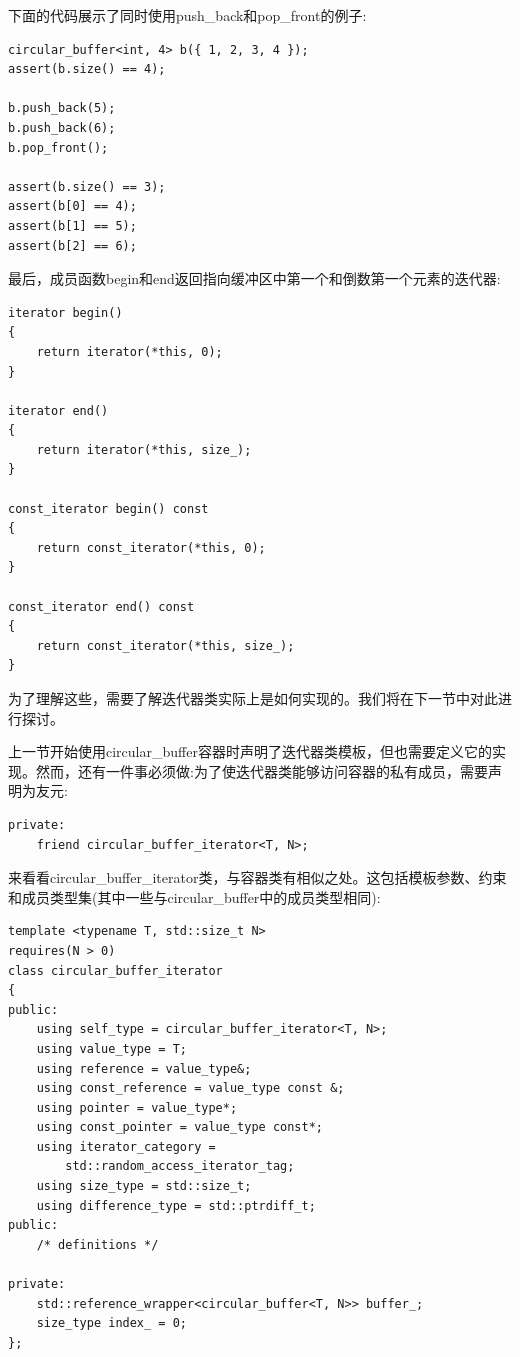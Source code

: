 下面的代码展示了同时使用push\_back和pop\_front的例子:

\begin{lstlisting}[style=styleCXX]
circular_buffer<int, 4> b({ 1, 2, 3, 4 });
assert(b.size() == 4);

b.push_back(5);
b.push_back(6);
b.pop_front();

assert(b.size() == 3);
assert(b[0] == 4);
assert(b[1] == 5);
assert(b[2] == 6);
\end{lstlisting}

最后，成员函数begin和end返回指向缓冲区中第一个和倒数第一个元素的迭代器:

\begin{lstlisting}[style=styleCXX]
iterator begin()
{
	return iterator(*this, 0);
}

iterator end()
{
	return iterator(*this, size_);
}

const_iterator begin() const
{
	return const_iterator(*this, 0);
}

const_iterator end() const
{
	return const_iterator(*this, size_);
}
\end{lstlisting}

为了理解这些，需要了解迭代器类实际上是如何实现的。我们将在下一节中对此进行探讨。


上一节开始使用circular\_buffer容器时声明了迭代器类模板，但也需要定义它的实现。然而，还有一件事必须做:为了使迭代器类能够访问容器的私有成员，需要声明为友元:

\begin{lstlisting}[style=styleCXX]
private:
	friend circular_buffer_iterator<T, N>;
\end{lstlisting}

来看看circular\_buffer\_iterator类，与容器类有相似之处。这包括模板参数、约束和成员类型集(其中一些与circular\_buffer中的成员类型相同):

\begin{lstlisting}[style=styleCXX]
template <typename T, std::size_t N>
requires(N > 0)
class circular_buffer_iterator
{
public:
	using self_type = circular_buffer_iterator<T, N>;
	using value_type = T;
	using reference = value_type&;
	using const_reference = value_type const &;
	using pointer = value_type*;
	using const_pointer = value_type const*;
	using iterator_category =
		std::random_access_iterator_tag;
	using size_type = std::size_t;
	using difference_type = std::ptrdiff_t;
public:
	/* definitions */
	
private:
	std::reference_wrapper<circular_buffer<T, N>> buffer_;
	size_type index_ = 0;
};
\end{lstlisting}

